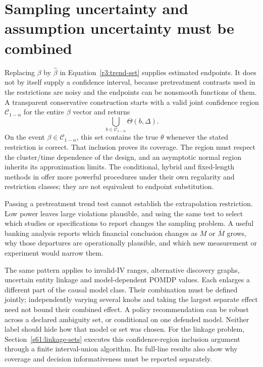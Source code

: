 \section{Sampling uncertainty and assumption uncertainty must be combined}
\label{r3:sensitivity-inference}
Replacing $\beta$ by $\widehat\beta$ in
Equation~\eqref{r3:trend-set} supplies estimated endpoints. It does
not by itself supply a confidence interval, because pretreatment
contrasts used in the restrictions are noisy and the endpoints can
be nonsmooth functions of them. A transparent conservative
construction starts with a valid joint confidence region
$\mathcal C_{1-\alpha}$ for the entire $\beta$ vector and returns
\[
 \bigcup_{b\in\mathcal C_{1-\alpha}}\Theta(b,\Delta).
\]
On the event $\beta\in\mathcal C_{1-\alpha}$, this set contains
the true $\theta$ whenever the stated restriction is correct.
That inclusion proves its coverage. The region must respect the
cluster/time dependence of the design, and an asymptotic normal
region inherits its approximation limits. The conditional,
hybrid and fixed-length methods in
\citet[Sections 3--4]{rambachan2023} offer more powerful procedures
under their own regularity and restriction classes; they are not
equivalent to endpoint substitution.

Passing a pretreatment trend test cannot establish the extrapolation
restriction. Low power leaves large violations plausible, and using
the same test to select which studies or specifications to report
changes the sampling problem. A useful banking analysis reports
which financial conclusion changes as $M$ or $\overline M$ grows,
why those departures are operationally plausible, and which new
measurement or experiment would narrow them.

The same pattern applies to invalid-IV ranges, alternative discovery
graphs, uncertain entity linkage and model-dependent POMDP values.
Each enlarges a different part of the causal model class. Their
combination must be defined jointly; independently varying several
knobs and taking the largest separate effect need not bound their
combined effect. A policy recommendation can be robust across a
declared ambiguity set, or conditional on one defended model. Neither
label should hide how that model or set was chosen.
For the linkage problem, Section~\ref{s61:linkage-sets} executes this
confidence-region inclusion argument through a finite interval-union
algorithm. Its full-line results also show why coverage and decision
informativeness must be reported separately.

